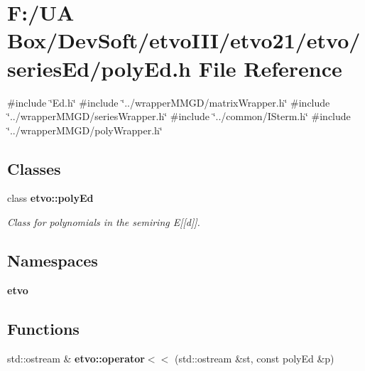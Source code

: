 \section{F\+:/\+UA Box/\+Dev\+Soft/etvo\+I\+I\+I/etvo21/etvo/series\+Ed/poly\+Ed.h File Reference}
\label{poly_ed_8h}
{\ttfamily \#include \char`\"{}Ed.\+h\char`\"{}}\newline
{\ttfamily \#include \char`\"{}../wrapper\+M\+M\+G\+D/matrix\+Wrapper.\+h\char`\"{}}\newline
{\ttfamily \#include \char`\"{}../wrapper\+M\+M\+G\+D/series\+Wrapper.\+h\char`\"{}}\newline
{\ttfamily \#include \char`\"{}../common/\+I\+Sterm.\+h\char`\"{}}\newline
{\ttfamily \#include \char`\"{}../wrapper\+M\+M\+G\+D/poly\+Wrapper.\+h\char`\"{}}\newline
\subsection*{Classes}
\begin{DoxyCompactItemize}
\item 
class \textbf{ etvo\+::poly\+Ed}
\begin{DoxyCompactList}\small\item\em Class for polynomials in the semiring E[[d]]. \end{DoxyCompactList}\end{DoxyCompactItemize}
\subsection*{Namespaces}
\begin{DoxyCompactItemize}
\item 
 \textbf{ etvo}
\end{DoxyCompactItemize}
\subsection*{Functions}
\begin{DoxyCompactItemize}
\item 
\mbox{\label{namespaceetvo_a415e12b531f5e08e1ec14e5f37eb3065}} 
std\+::ostream \& {\bfseries etvo\+::operator$<$$<$} (std\+::ostream \&st, const poly\+Ed \&p)
\end{DoxyCompactItemize}
